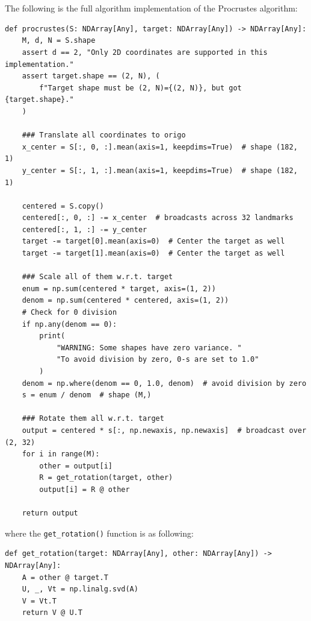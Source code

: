 \section{} %

\subsection{} %
The following is the full algorithm implementation of the Procrustes algorithm:

\begin{lstlisting}
def procrustes(S: NDArray[Any], target: NDArray[Any]) -> NDArray[Any]:
    M, d, N = S.shape
    assert d == 2, "Only 2D coordinates are supported in this implementation."
    assert target.shape == (2, N), (
        f"Target shape must be (2, N)={(2, N)}, but got {target.shape}."
    )

    ### Translate all coordinates to origo
    x_center = S[:, 0, :].mean(axis=1, keepdims=True)  # shape (182, 1)
    y_center = S[:, 1, :].mean(axis=1, keepdims=True)  # shape (182, 1)

    centered = S.copy()
    centered[:, 0, :] -= x_center  # broadcasts across 32 landmarks
    centered[:, 1, :] -= y_center
    target -= target[0].mean(axis=0)  # Center the target as well
    target -= target[1].mean(axis=0)  # Center the target as well

    ### Scale all of them w.r.t. target
    enum = np.sum(centered * target, axis=(1, 2))
    denom = np.sum(centered * centered, axis=(1, 2))
    # Check for 0 division
    if np.any(denom == 0):
        print(
            "WARNING: Some shapes have zero variance. "
            "To avoid division by zero, 0-s are set to 1.0"
        )
    denom = np.where(denom == 0, 1.0, denom)  # avoid division by zero
    s = enum / denom  # shape (M,)

    ### Rotate them all w.r.t. target
    output = centered * s[:, np.newaxis, np.newaxis]  # broadcast over (2, 32)
    for i in range(M):
        other = output[i]
        R = get_rotation(target, other)
        output[i] = R @ other

    return output
\end{lstlisting}
where the \lstinline{get_rotation()} function is as following:
\begin{lstlisting}
def get_rotation(target: NDArray[Any], other: NDArray[Any]) -> NDArray[Any]:
    A = other @ target.T
    U, _, Vt = np.linalg.svd(A)
    V = Vt.T
    return V @ U.T
\end{lstlisting}

